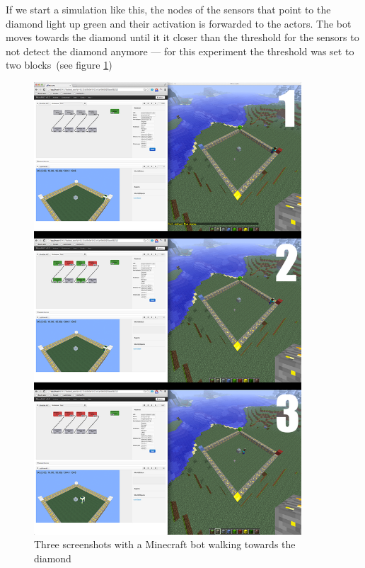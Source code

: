 If we start a simulation like this, the nodes of the sensors that point to the diamond light up green and their activation is forwarded to the actors. The bot moves towards the diamond until it it closer than the threshold for the sensors to not detect the diamond anymore --- for this experiment the threshold was set to two blocks~(see figure \ref{diamond_screens})

\begin{figure}[h]
  \centering
    \includegraphics[width=10cm]{graphics/diamond_screens}
  \caption{Three screenshots with a Minecraft bot walking towards the diamond}
  \label{diamond_screens}
\end{figure}